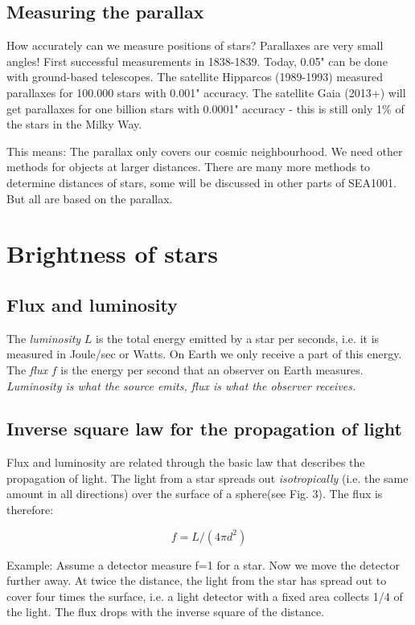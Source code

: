 \subsection{Measuring the parallax}

How accurately can we measure positions of stars? Parallaxes are very small angles! First successful measurements in 1838-1839. Today, 0.05" can be done with ground-based telescopes. The satellite Hipparcos (1989-1993) measured parallaxes for 100.000 stars with 0.001" accuracy. The satellite Gaia (2013+) will get parallaxes for one billion stars with 0.0001" accuracy - this is still only 1\% of the stars in the Milky Way.

This means: The parallax only covers our cosmic neighbourhood. We need other methods for objects at larger distances. There are many more methods to determine distances of stars, some will be discussed in other parts of SEA1001. But all are based on the parallax.

\section{Brightness of stars}

\subsection{Flux and luminosity}

The \textit{luminosity} $L$ is the total energy emitted by a star per seconds, i.e. it is measured in Joule/sec or Watts. On Earth we only receive a part of this energy. The \textit{flux} $f$ is the energy per second that an observer on Earth measures. \textit{Luminosity is what the source emits, flux is what the observer receives.}

\subsection{Inverse square law for the propagation of light}

Flux and luminosity are related through the basic law that describes the propagation of light. The light from a star spreads out \textit{isotropically} (i.e. the same amount in all directions) over the surface of a sphere(see Fig. 3). The flux is therefore:

\begin{equation}
f = L / (4 \pi d^2)
\end{equation}

Example: Assume a detector measure f=1 for a star. Now we move the detector further away. At twice the distance, the light from the star has spread out to cover four times the surface, i.e. a light detector with a fixed area collects 1/4 of the light. The flux drops with the inverse square of the distance.

